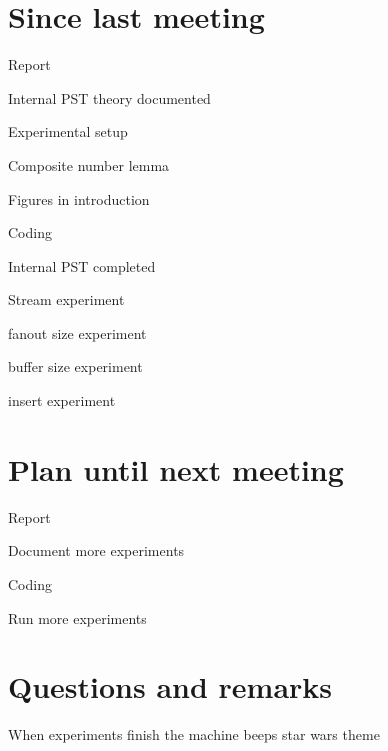 \documentclass[a4paper,11pt,agenda,chair]{meetingmins}
\begin{document}
\maketitle

\section{Since last meeting}
\begin{items}
\item Report
	\begin{items}
		\item Internal PST theory documented
		\item Experimental setup
		\item Composite number lemma
		\item Figures in introduction
	\end{items}
\item Coding
	\begin{items}
		\item Internal PST completed
		\item Stream experiment
		\item fanout size experiment
		\item buffer size experiment
		\item insert experiment
	\end{items}
\end{items}

\section{Plan until next meeting}
\begin{items}
\item Report
	\begin{items}
		\item Document more experiments
	\end{items}
\item Coding
	\begin{items}
		\item Run more experiments
	\end{items}
\end{items}

\section{Questions and remarks}
\begin{items}
	\item When experiments finish the machine beeps star wars theme
\end{items}
\end{document}
